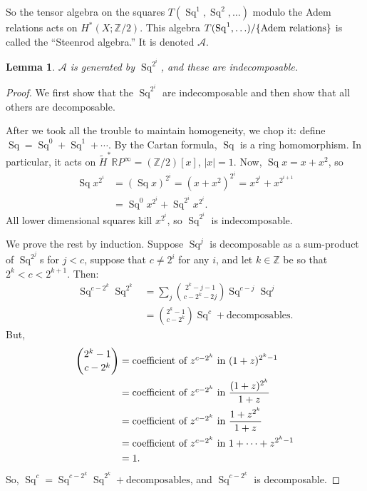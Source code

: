 \documentclass{article}
\newcommand{\Z}{\mathbb{Z}}
\newcommand{\R}{\mathbb{R}}
\newcommand{\RP}{\R P}
\newcommand{\SA}{\mathcal{A}}
\DeclareMathOperator{\Sq}{Sq}
\newtheorem{lem}[thm]{Lemma}
\begin{document}
So the tensor algebra on the squares $T(\Sq^1, \Sq^2, \ldots)$ modulo the Adem relations acts on $H^*(X; \Z/2)$.  This algebra $T(\Sq^1, \ldots) / \{\hbox{Adem relations}\}$ is called the ``Steenrod algebra.''  It is denoted $\SA$.
\begin{lem}
$\SA$ is generated by $\Sq^{2^i}$, and these are indecomposable.
\end{lem}
\begin{proof}
We first show that the $\Sq^{2^i}$ are indecomposable and then show that all others are decomposable.

After we took all the trouble to maintain homogeneity, we chop it: define $\Sq = \Sq^0 + \Sq^1 + \cdots$.  By the Cartan formula, $\Sq$ is a ring homomorphism.  In particular, it acts on $\widetilde H^* \RP^\infty = (\Z/2)[x]$, $|x| = 1$.  Now, $\Sq x = x + x^2$, so
\begin{align*}
\Sq x^{2^i} & = (\Sq x)^{2^i} = (x + x^2)^{2^i} = x^{2^i} + x^{2^{i+1}} \\
& = \Sq^0 x^{2^i} + \Sq^{2^i} x^{2^i}.
\end{align*}
All lower dimensional squares kill $x^{2^i}$, so $\Sq^{2^i}$ is indecomposable.

We prove the rest by induction.  Suppose $\Sq^j$ is decomposable as a sum-product of $\Sq^{2^j}$s for $j < c$, suppose that $c \ne 2^i$ for any $i$, and let $k \in \Z$ be so that $2^k < c < 2^{k+1}$.  Then:
\begin{align*}
\Sq^{c-2^k} \Sq^{2^k} & = \sum_j \binom{2^k - j - 1}{c-2^k-2j} \Sq^{c-j}\Sq^j \\
& = \binom{2^k - 1}{c-2^k} \Sq^c + \mathrm{decomposables}.
\end{align*}
But,
\begin{align*}
\binom{2^k-1}{c-2^k} & = \hbox{coefficient of $z^{c-2^k}$ in}\ (1 + z)^{2^k-1} \\
& = \hbox{coefficient of $z^{c-2^k}$ in}\ \frac{(1+z)^{2^k}}{1+z} \\
& = \hbox{coefficient of $z^{c-2^k}$ in}\ \frac{1 + z^{2^k}}{1+z} \\
& = \hbox{coefficient of $z^{c-2^k}$ in}\ 1 + \cdots + z^{2^k - 1} \\
& = 1.
\end{align*}
So, $\Sq^c = \Sq^{c-2^k} \Sq^{2^k} + \mathrm{decomposables}$, and $\Sq^{c - 2^k}$ is decomposable.
\end{proof}
\end{document}
